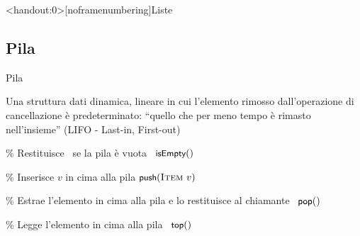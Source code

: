 \begin{frame}<handout:0>[noframenumbering]{Liste}

\end{frame}


\subsection{Pila}

\begin{frame}[shrink=10]{Pila}
\begin{myboxtitle}
Una struttura dati dinamica, lineare in cui l'elemento rimosso dall'operazione
di cancellazione è predeterminato: “quello che per meno tempo è rimasto
nell'insieme” (\alert{LIFO - Last-in, First-out})
\end{myboxtitle}


\begin{Procedure}
\caption[A]{\Stack}

\% Restituisce \TRUE\ se la pila è vuota\;
\alert{\BOOLEAN\ $\textsf{{\small isEmpty}}()$\;}
\BlankLine

\% Inserisce $v$ in cima alla pila\;
\alert{$\textsf{{\small push}}(\textsc{Item}\ v)$\;}
\BlankLine

\% Estrae l'elemento in cima alla pila e lo restituisce al chiamante\;
\alert{\Item\ $\textsf{{\small pop}}()$\;}
\BlankLine

\% Legge l'elemento in cima alla pila\;
\alert{\Item\ $\textsf{{\small top}}()$\;}

\end{Procedure}
\end{frame}

